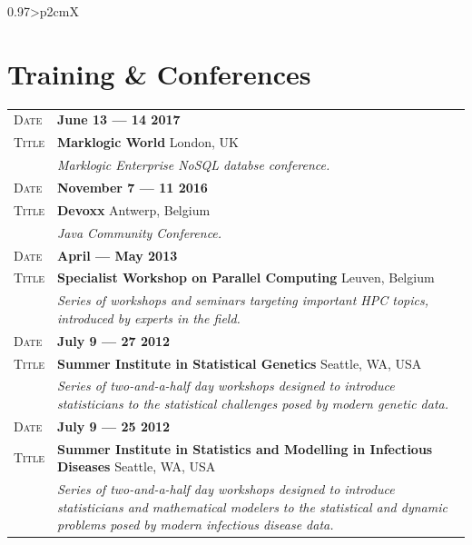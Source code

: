 \documentclass[a4paper, oneside, final]{scrartcl}
\newcommand{\gray}{\rowcolor[gray]{.90}}
\begin{document}
\begin{center}
\begin{tabularx}{0.97\linewidth}{>{\raggedleft\scshape}p{2cm}X}
{                    %
                    }
    \end{tabularx}  
     
\section{Training \& Conferences}

    \begin{tabularx}{0.97\linewidth}{>{\raggedleft\scshape}p{2cm}X}

             \gray Date & \textbf{June 13 --- 14 2017}\\
    \gray Title  & \textbf{Marklogic World} \hfill London, UK\\
           & \emph{Marklogic Enterprise NoSQL databse conference.}
   \\
    
             \gray Date & \textbf{November 7 --- 11 2016}\\
    \gray Title  & \textbf{Devoxx} \hfill Antwerp, Belgium\\
           & \emph{Java Community Conference.}
   \\

             \gray Date & \textbf{April --- May 2013}\\
    \gray Title  & \textbf{Specialist Workshop on Parallel Computing} \hfill Leuven, Belgium\\
           & \emph{Series of workshops and seminars targeting important HPC topics, introduced by experts in the field.}
   \\
    
         \gray Date & \textbf{July 9 --- 27 2012}\\
    \gray Title  & \textbf{Summer Institute in Statistical Genetics} \hfill Seattle, WA, USA\\
           & \emph{Series of two-and-a-half day workshops designed to introduce statisticians to the statistical challenges posed by modern genetic data.}
   \\
 
        \gray Date & \textbf{July 9 --- 25 2012}\\
    \gray Title  & \textbf{Summer Institute in Statistics and Modelling in Infectious Diseases} \hfill Seattle, WA, USA\\
           & \emph{Series of two-and-a-half day workshops designed to introduce statisticians and mathematical modelers to the statistical and dynamic problems posed by modern infectious disease data.}
   \\
 

\end{tabularx}
\end{center}
\end{document}
